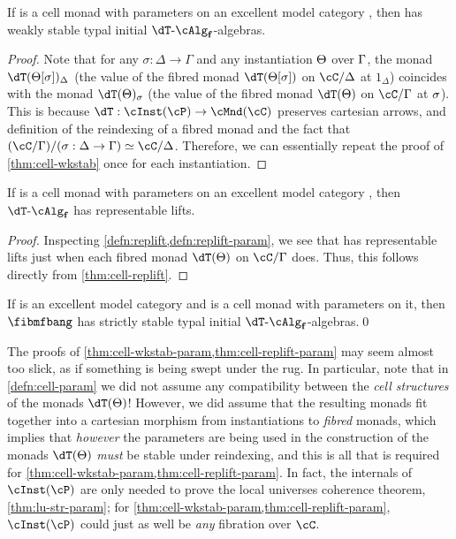 \documentclass{amsart}
\let\P\cP
\def\alg{\text{-}\cAlg}
\def\algf{\alg_{\mathbf{f}}}
\let\C\cC
\begin{document}
\begin{thm}\label{thm:cell-wkstab-param}
  If \dT is a cell monad with parameters on an excellent model category \sM, then \fibmf has weakly stable typal initial $\dT\algf$-algebras.
\end{thm}
\begin{proof}
  Note that for any $\sigma:\Delta\to\Gamma$ and any instantiation $\Theta$ over $\Gamma$, the monad $\dT(\Th[\si])_\De$ (the value of the fibred monad $\dT(\Th[\si])$ on $\C/\Delta$ at $1_\Delta$) coincides with the monad $\dT(\Th)_{\si}$ (the value of the fibred monad $\dT(\Th)$ on $\C/\Gamma$ at $\sigma$).
  This is because $\dT: \cInst(\P) \to \cMnd(\C)$ preserves cartesian arrows, and definition of the reindexing of a fibred monad and the fact that $(\C/\Gm)/(\si:\De\to\Gm) \simeq \C/\De$.
  Therefore, we can essentially repeat the proof of \cref{thm:cell-wkstab} once for each instantiation.
\end{proof}

\begin{thm}\label{thm:cell-replift-param}
  If \dT is a cell monad with parameters on an excellent model category \sM, then $\dT\algf$ has representable lifts.
\end{thm}
\begin{proof}
  Inspecting \cref{defn:replift,defn:replift-param}, we see that \dT has representable lifts just when each fibred monad $\dT(\Th)$ on $\C/\Gamma$ does.
  Thus, this follows directly from \cref{thm:cell-replift}.
\end{proof}

\begin{cor}\label{thm:cellmndparam}
  If \sM is an excellent model category and \dT is a cell monad with parameters on it, then $\fibmfbang$ has strictly stable typal initial $\dT\algf$-algebras.\qed
\end{cor}

The proofs of \cref{thm:cell-wkstab-param,thm:cell-replift-param} may seem almost too slick, as if something is being swept under the rug.
In particular, note that in \cref{defn:cell-param} we did not assume any compatibility between the \emph{cell structures} of the monads $\dT(\Th)$!
However, we did assume that the resulting monads fit together into a cartesian morphism from instantiations to \emph{fibred} monads, which implies that \emph{however} the parameters are being used in the construction of the monads $\dT(\Th)$ \emph{must} be stable under reindexing, and this is all that is required for \cref{thm:cell-wkstab-param,thm:cell-replift-param}.
In fact, the internals of $\cInst(\P)$ are only needed to prove the local universes coherence theorem, \cref{thm:lu-str-param}; for \cref{thm:cell-wkstab-param,thm:cell-replift-param}, $\cInst(\P)$ could just as well be \emph{any} fibration over $\C$.
\end{document}
